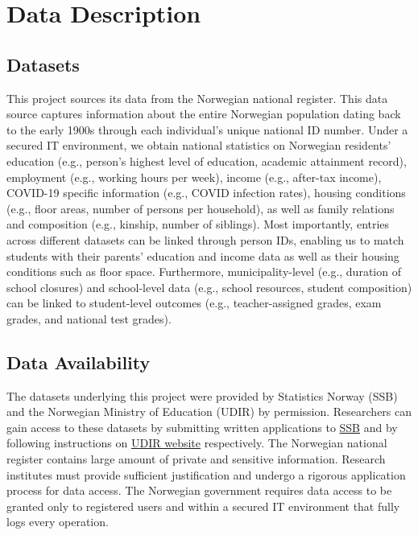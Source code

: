 \section{Data Description}

\subsection{Datasets}
This project sources its data from the Norwegian national register. This data source captures information about the entire Norwegian population dating back to the early 1900s through each individual's unique national ID number. Under a secured IT environment, we obtain national statistics on Norwegian residents' education (e.g., person's highest level of education, academic attainment record), employment (e.g., working hours per week), income (e.g., after-tax income), COVID-19 specific information (e.g., COVID infection rates), housing conditions (e.g., floor areas, number of persons per household), as well as family relations and composition (e.g., kinship, number of siblings). Most importantly, entries across different datasets can be linked through person IDs, enabling us to match students with their parents' education and income data as well as their housing conditions such as floor space. Furthermore, municipality-level (e.g., duration of school closures) and school-level data (e.g., school resources, student composition) can be linked to student-level outcomes (e.g., teacher-assigned grades, exam grades, and national test grades).

\subsection{Data Availability}
The datasets underlying this project were provided by Statistics Norway (SSB) and the Norwegian Ministry of Education (UDIR) by permission. Researchers can gain access to these datasets by submitting written applications to \href{https://www.ssb.no/en/omssb/tjenester-og-verktoy/data-til-forskning}{SSB} and by following instructions on \href{https://login.udir.no/LoggInn/logginn}{UDIR website} respectively. The Norwegian national register contains large amount of private and sensitive information. Research institutes must provide sufficient justification and undergo a rigorous application process for data access. The Norwegian government requires data access to be granted only to registered users and within a secured IT environment that fully logs every operation.

